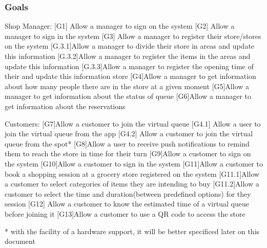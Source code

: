 \subsubsection{Goals}
\label{subsect:goals}

Shop Manager:
[G1] Allow a manager to sign on the system
[G2] Allow a manager to sign in the system
[G3] Allow a manager to register their store/stores on the system
	[G.3.1]Allow a manager to divide their store in areas and update this information	
	[G.3.2]Allow a manager to register the items in the areas and update this information
	[G.3.3]Allow a manager to register the opening time of their and update this information
        store
[G4]Allow a manager to get information about how many people there are in the store at a given moment
[G5]Allow a manager to get information about the status of queue
[G6]Allow a manager to get information about the reservations

Customers:
[G7]Allow a customer to join the virtual queue 
    [G4.1] Allow a user to join the virtual queue from the app
    [G4.2] Allow a customer to join the virtual queue from the spot*
[G8]Allow a user to receive push notifications to remind them to reach the store in time for their turn
[G9]Allow a customer to sign on the system
[G10]Allow a customer to sign in the system
[G11]Allow a customer to book a shopping session at a grocery store registered on the system
	[G11.1]Allow a customer to select categories of items they are 		intending to 
	buy
	[G11.2]Allow a customer to select the time and duration(between 		predefined options) for they session 	
[G12] Allow a customer to know the estimated time of a virtual queue before		joining it
[G13]Allow a customer to use a QR code to access the store 


* with the facility of a hardware support, it will be better specificed later on this document

